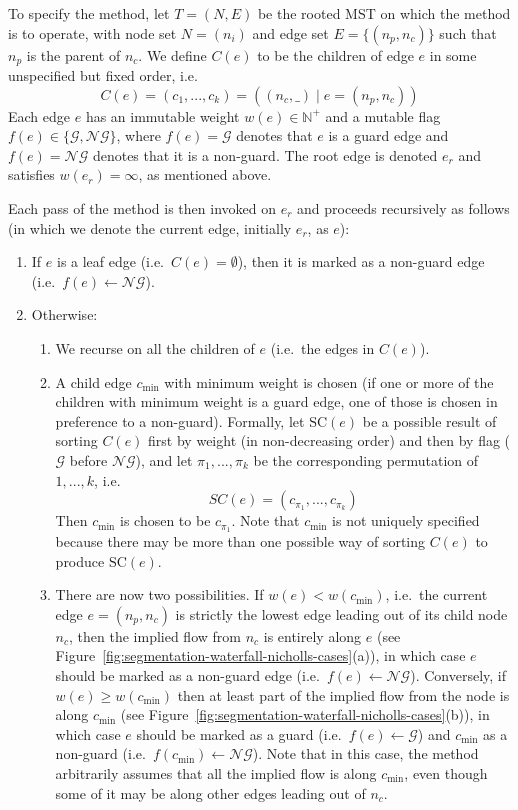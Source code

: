 \documentclass[preprint,a4paper]{elsarticle}
\begin{document}
To specify the method, let $T = (N,E)$ be the rooted MST on which the method is to operate, with node set $N = (n_i)$ and edge set $E = \{(n_p,n_c)\}$ such that $n_p$ is the parent of $n_c$. We define $C(e)$ to be the children of edge $e$ in some unspecified but fixed order, i.e.
%
\[
C(e) = (c_1,...,c_k) = ((n_c,\_) \; | \; e = (n_p,n_c))
\]
%
Each edge $e$ has an immutable weight $w(e) \in \mathbb{N}^+$ and a mutable flag $f(e) \in \{\mathcal{G},\mathcal{NG}\}$, where $f(e) = \mathcal{G}$ denotes that $e$ is a guard edge and $f(e) = \mathcal{NG}$ denotes that it is a non-guard. The root edge is denoted $e_r$ and satisfies $w(e_r) = \infty$, as mentioned above.

Each pass of the method is then invoked on $e_r$ and proceeds recursively as follows (in which we denote the current edge, initially $e_r$, as $e$):
%
\begin{enumerate}

\item If $e$ is a leaf edge (i.e.~$C(e) = \emptyset$), then it is marked as a non-guard edge (i.e.~$f(e) \leftarrow \mathcal{NG}$).

\item Otherwise:

\begin{enumerate}

\item We recurse on all the children of $e$ (i.e.~the edges in $C(e)$).

\item A child edge $c_{\min}$ with minimum weight is chosen (if one or more of the children with minimum weight is a guard edge, one of those is chosen in preference to a non-guard). Formally, let $\mbox{SC}(e)$ be a possible result of sorting $C(e)$ first by weight (in non-decreasing order) and then by flag ($\mathcal{G}$ before $\mathcal{NG}$), and let $\pi_1,...,\pi_k$ be the corresponding permutation of $1,...,k$, i.e.
%
\[
SC(e) = (c_{\pi_1},...,c_{\pi_k})
\]
%
Then $c_{\min}$ is chosen to be $c_{\pi_1}$. Note that $c_{\min}$ is not uniquely specified because there may be more than one possible way of sorting $C(e)$ to produce $\mbox{SC}(e)$.

\item There are now two possibilities. If $w(e) < w(c_{\min})$, i.e.~the current edge $e = (n_p,n_c)$ is strictly the lowest edge leading out of its child node $n_c$, then the implied flow from $n_c$ is entirely along $e$ (see Figure~\ref{fig:segmentation-waterfall-nicholls-cases}(a)), in which case $e$ should be marked as a non-guard edge (i.e.~$f(e) \leftarrow \mathcal{NG}$). Conversely, if $w(e) \ge w(c_{\min})$ then at least part of the implied flow from the node is along $c_{\min}$ (see Figure~\ref{fig:segmentation-waterfall-nicholls-cases}(b)), in which case $e$ should be marked as a guard (i.e.~$f(e) \leftarrow \mathcal{G}$) and $c_{\min}$ as a non-guard (i.e.~$f(c_{\min}) \leftarrow \mathcal{NG}$). Note that in this case, the method arbitrarily assumes that all the implied flow is along $c_{\min}$, even though some of it may be along other edges leading out of $n_c$.


\end{enumerate}
\end{enumerate}
\end{document}
